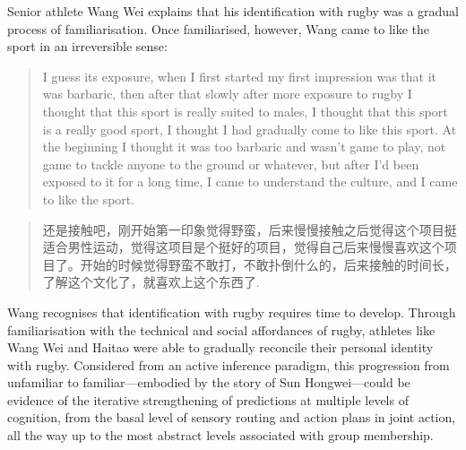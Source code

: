 \begin{CJK}{UTF8}{gbsn}

Senior athlete Wang Wei explains that his identification with rugby was a gradual process of familiarisation. Once familiarised, however, Wang came to like the sport in an irreversible sense:

  \begin{quote}
    I guess its exposure, when I first started my first impression was that it was barbaric, then after that slowly after more exposure to rugby I thought that this sport is really suited to males, I thought that this sport is a really good sport, I thought I had gradually come to like this sport.  At the beginning I thought it was too barbaric and wasn’t game to play, not game to tackle anyone to the ground or whatever, but after I’d been exposed to it for a long time, I came to understand the culture, and I came to like the sport.
  \end{quote}

  \begin{quote}
    还是接触吧，刚开始第一印象觉得野蛮，后来慢慢接触之后觉得这个项目挺适合男性运动，觉得这项目是个挺好的项目，觉得自己后来慢慢喜欢这个项目了。开始的时候觉得野蛮不敢打，不敢扑倒什么的，后来接触的时间长，了解这个文化了，就喜欢上这个东西了.
  \end{quote}

Wang recognises that identification with rugby requires time to develop. Through familiarisation with the technical and social affordances of rugby, athletes like Wang Wei and Haitao were able to gradually reconcile their personal identity with rugby.  Considered from an active inference paradigm, this progression from unfamiliar to familiar---embodied by the story of Sun Hongwei---could be evidence of the iterative strengthening of predictions at multiple levels of cognition, from the basal level of sensory routing and action plans in joint action, all the way up to the most abstract levels associated with group membership.




\end{CJK}
